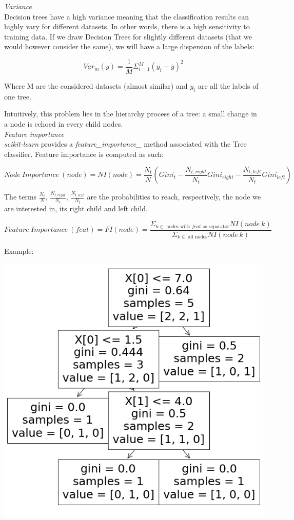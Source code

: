 \textit{Variance} \\

Decision trees have a high variance meaning that the classification results can highly vary for different datasets. In other words, there is a high sensitivity to training data. If we draw Decision Trees for slightly different datasets (that we would however consider the same), we will have a large dispersion of the labels:

$$Var_m(y) = \frac{1}{M}\Sigma_{i=1}^M(y_i - \overline{y})^2$$

Where M are the considered datasets (almost similar) and $y_i$ are all the labels of one tree.

Intuitively, this problem lies in the hierarchy process of a tree: a small change in a node is echoed in every child nodes. \\

\textit{Feature importance} \\

\textit{scikit-learn} provides a \textit{feature\_importance\_} method associated with the Tree classifier. Feature importance is computed as such:

$$Node~Importance~(node) = NI(node) = \frac{N_t}{N}(Gini_t - \frac{N_{t,right}}{N_t}Gini_{right} - \frac{N_{t,left}}{N_t}Gini_{left})$$

The terms $\frac{N_t}{N}$,  $\frac{N_{t,right}}{N_t}$, $\frac{N_{t,left}}{N_t}$ are the probabilities to reach, respectively, the node we are interested in, its right child and left child.

$$Feature~Importance~(feat) = FI(node) = \frac{\Sigma_{k \in \text{ nodes with } \textit{feat } \text{as separator}}NI(node~k)}{\Sigma_{k \in \text{ all nodes}}NI(node~k)}$$

Example:

\begin{center}
\includegraphics[scale=0.4]{tree_feat_importance.png}
\end{center}

